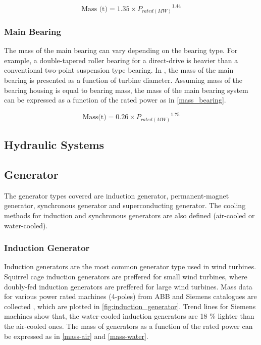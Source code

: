 \documentclass{article}
\begin{document}
\begin{equation}
		\text{Mass (t)} = 1.35 \times {P_{rated(MW)}}^{1.44}
\end{equation}

\subsubsection{Main Bearing}

The mass of the main bearing can vary depending on the bearing type. For example, a double-tapered roller bearing for a direct-drive is heavier than a conventional two-point suspension type bearing. In  \cite{Fingersh2006}, the mass of the main bearing is presented as a function of turbine diameter. Assuming mass of the bearing housing is equal to bearing mass, the mass of the main bearing system can be expressed as a function of the rated power as in \autoref{mass_bearing}.

\begin{equation}
	\text{Mass(t)} = 0.26 \times {P_{rated(MW)}}^{1.75}
  \label{mass_bearing}
\end{equation}

\subsection{Hydraulic Systems}

\subsection{Generator}

The generator types covered are induction generator, permanent-magnet generator, synchronous generator and superconducting generator. The cooling methods for induction and synchronous generators are also defined (air-cooled or water-cooled). 

\subsubsection{Induction Generator}

Induction generators are the most common generator type used in wind turbines. Squirrel cage induction generators are preffered for small wind turbines, where doubly-fed induction generators are preffered for large wind turbines. Mass data for various power rated machines (4-poles) from ABB and Siemens catalogues are collected \cite{ABB2012, Siemens}, which are plotted in \autoref{fig:induction_generator}. Trend lines for Siemens machines show that, the water-cooled induction generators are 18 \% lighter than the air-cooled ones. The mass of generators as a function of the rated power can be expressed as in \autoref{mass-air} and \autoref{mass-water}.
\end{document}
